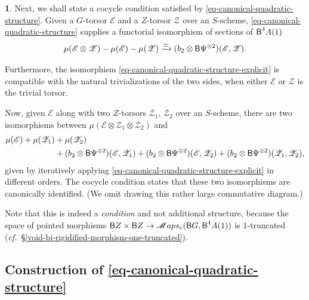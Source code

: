 \documentclass[10pt,english,reqno]{amsart}
\newcommand{\SMaps}{\mathscr{M}aps}
\newcommand{\deloop}{\textnormal{\textsf{B}}}
\theoremstyle{definition}
\numberwithin{equation}{section}
\newtheorem{untitledsubsubsection}[subsubsection]{}
\newenvironment{void}
{\begin{untitledsubsubsection}}
{\end{untitledsubsubsection}}
\begin{document}

\begin{void}
\label{void-canonical-quadratic-structure-cocycle-condition}
Next, we shall state a cocycle condition satisfied by \eqref{eq-canonical-quadratic-structure}. Given a $G$-torsor $\mathscr E$ and a $Z$-torsor $\mathscr Z$ over an $S$-scheme, \eqref{eq-canonical-quadratic-structure} supplies a functorial isomorphism of sections of $\deloop^4A(1)$
\begin{equation}
\label{eq-canonical-quadratic-structure-explicit}
\mu(\mathscr E\otimes \mathscr Z) - \mu(\mathscr E) - \mu(\mathscr Z) \xrightarrow{\simeq} (b_2\otimes \deloop\Psi^{\otimes 2})(\mathscr E, \mathscr Z).
\end{equation}

Furthermore, the isomorphism \eqref{eq-canonical-quadratic-structure-explicit} is compatible with the natural trivializations of the two sides, when either $\mathscr E$ or $\mathscr Z$ is the trivial torsor.

Now, given $\mathscr E$ along with two $Z$-torsors $\mathscr Z_1$, $\mathscr Z_2$ over an $S$-scheme, there are two isomorphisms between $\mu(\mathscr E\otimes\mathscr Z_1 \otimes\mathscr Z_2)$ and
\begin{align*}
\mu(\mathscr E) + \mu(\mathscr Z_1) &+ \mu(\mathscr Z_2) \\
&+ (b_2\otimes \deloop\Psi^{\otimes 2})(\mathscr E, \mathscr Z_1) + (b_2 \otimes \deloop\Psi^{\otimes 2})(\mathscr E, \mathscr Z_2) + (b_2\otimes \deloop\Psi^{\otimes 2})(\mathscr Z_1, \mathscr Z_2),
\end{align*}
given by iteratively applying \eqref{eq-canonical-quadratic-structure-explicit} in different orders. The cocycle condition states that these two isomorphisms are canonically identified. (We omit drawing this rather large commutative diagram.)

Note that this is indeed a \emph{condition} and not additional structure, because the space of pointed morphisms $\deloop Z \times \deloop Z \rightarrow \SMaps_e(\deloop G, \deloop^4A(1))$ is $1$-truncated (\emph{cf.}~\S\ref{void-bi-rigidified-morphism-one-truncated}).
\end{void}



\subsection{Construction of \eqref{eq-canonical-quadratic-structure}}
\label{sec-quadratic-structure-construction}
\end{document}
